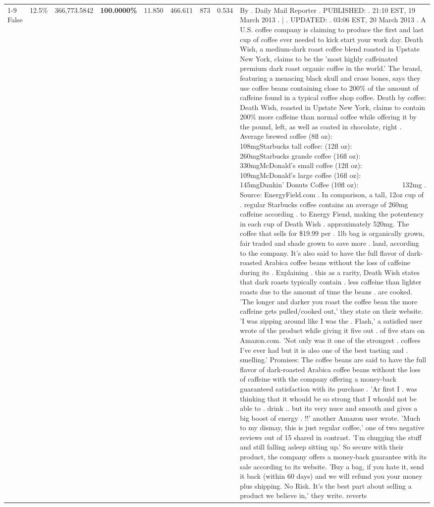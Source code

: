 \begin{table}[H]
{\begin{tabular}{lllrlllll}
\cline{1-9}
False & 12.5\% & 366,773.5842 & \bfseries \color{red} 100.0000\% & 11.850 & 466.611 & 873 & 0.534 & By . Daily Mail Reporter . PUBLISHED: . 21:10 EST, 19 March 2013 . | . UPDATED: . 03:06 EST, 20 March 2013 . A U.S. coffee company is claiming to produce the first and last cup of coffee ever needed to kick start your work day. Death Wish, a medium-dark roast coffee blend roasted in Upstate New York, claims to be the 'most highly caffeinated premium dark roast organic coffee in the world.' The brand, featuring a menacing black skull and cross bones, says they use coffee beans containing close to 200\% of the amount of caffeine found in a typical coffee shop coffee. Death by coffee: Death Wish, roasted in Upstate New York, claims to contain 200\% more caffeine than normal coffee while offering it by the pound, left, as well as coated in chocolate, right . Average brewed coffee (8fl oz):              108mgStarbucks tall coffee: (12fl oz):                260mgStarbucks grande coffee (16fl oz):         330mgMcDonald's small coffee (12fl oz):           109mgMcDonald's large coffee (16fl oz):           145mgDunkin' Donuts Coffee (10fl oz):             132mg . Source: EnergyField.com . In comparison, a tall, 12oz cup of . regular Starbucks coffee contains an average of 260mg caffeine according . to Energy Fiend, making the potentency in each cup of Death Wish . approximately 520mg. The coffee that sells for \$19.99 per . 1lb bag is organically grown, fair traded and shade grown to save more . land, according to the company. It's also said to have the full flavor of dark-roasted Arabica coffee beans without the loss of caffeine during its . Explaining . this as a rarity, Death Wish states that dark roasts typically contain . less caffeine than lighter roasts due to the amount of time the beans . are cooked. 'The longer and darker you roast the coffee bean the more caffeine gets pulled/cooked out,' they state on their website. 'I was zipping around like I was the . Flash,' a satisfied user wrote of the product while giving it five out . of five stars on Amazon.com. 'Not only was it one of the strongest . coffees I've ever had but it is also one of the best tasting and . smelling.’ Promises: The coffee beans are said to have the full flavor of dark-roasted Arabica coffee beans without the loss of caffeine with the company offering a money-back guaranteed satisfaction with its purchase . 'Ar first I . was thinking that it whould be so strong that I whould not be able to . drink .. but its very nuce and smooth and gives a big boost of energy . !!' another Amazon user wrote. 'Much to my dismay, this is just regular coffee,' one of two negative reviews out of 15 shared in contrast. 'I'm chugging the stuff and still falling asleep sitting up.' So secure with their product, the company offers a money-back guarantee with its sale according to its website. 'Buy a bag, if you hate it, send it back (within 60 days) and we will refund you your money plus shipping. No Risk. It’s the best part about selling a product we believe in,' they write. reverts \\

\end{tabular}}
\end{table}
